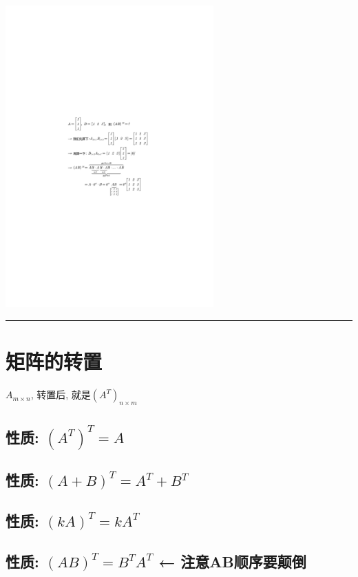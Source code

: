 \documentclass[UTF8]{ctexart}
\begin{document}
\begin{myEnvSample}
\includegraphics[width=0.6\textwidth]{img/0019.pdf}
\end{myEnvSample}


\hrule

\section{矩阵的转置}

$A_{m×n}$, 转置后, 就是$(A^T)_{n×m}$ \\

\subsection{性质: $(A^T) ^T = A$ }

\subsection{性质: $(A+B) ^T = A^T + B^T$ }

\subsection{性质: $(kA) ^T =  kA^T$ }

\subsection{ 性质: $(AB) ^T = B^T A^T$  ← 注意AB顺序要颠倒 }
\end{document}
